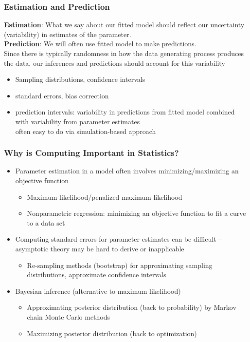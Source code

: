 \documentclass{beamer}
\begin{document}
\begin{frame}
\frametitle{Estimation and Prediction}
{\bf Estimation}: What we say about our fitted model should reflect
our uncertainty (variability) in estimates of the parameter.\\
{\bf Prediction}: We will often use fitted model to make predictions.\\
 Since there is typically randomness in how the data generating 
 process produces the data, our inferences and predictions should 
 account for this variability
\begin{itemize}
\item Sampling distributions, confidence intervals
\item standard errors, bias correction 
\item prediction intervals: variability in predictions from fitted
  model combined with variability from parameter estimates\\ often easy to
  do via simulation-based approach
\end{itemize}
\end{frame}

\begin{frame}
\frametitle{Why is Computing Important in Statistics?}
\begin{itemize}
\item Parameter estimation in a model often involves minimizing/maximizing an objective function
\begin{itemize}
\item Maximum likelihood/penalized maximum likelihood 
\item Nonparametric regression: minimizing an objective function to
  fit a curve to a data set
\end{itemize}
\item Computing standard errors for parameter estimates can be  
  difficult -- asymptotic theory may be hard to derive or inapplicable 
\begin{itemize}
\item Re-sampling methods (bootstrap) for approximating sampling 
  distributions, approximate confidence intervals
\end{itemize}
\item Bayesian inference (alternative to maximum likelihood)
\begin{itemize}
\item Approximating posterior distribution (back to probability) by
  Markov chain Monte Carlo methods
\item Maximizing posterior distribution (back to optimization)
\end{itemize}
\end{itemize}
\end{frame}
\end{document}
